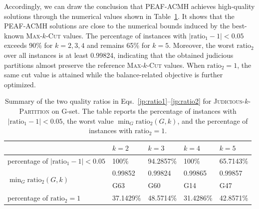\documentclass[12pt, a4paper]{article}%
\numberwithin{equation}{section}
\theoremstyle{plain}
\begin{document}
            Accordingly, we can draw the conclusion that PEAF-ACMH achieves high-quality solutions through the numerical values shown in Table~\ref{tab:jp-quality}. {It shows that the PEAF-ACMH solutions are close to the numerical
bounds induced by the best-known \textsc{Max}-$k$-\textsc{Cut} values. The
percentage of instances with $|\text{ratio}_1-1|<0.05$ exceeds 90\% for
$k=2,3,4$ and remains 65\% for $k=5$. Moreover, the worst
$\text{ratio}_2$ over all instances is at least 0.99824, indicating
that the obtained judicious partitions almost preserve the reference
\textsc{Max}-$k$-\textsc{Cut} values. When $\text{ratio}_2=1$, the same cut
value is attained while the balance-related objective is further optimized.}
			
			
			
			\begin{table}[htbp]
				\centering
				\caption{{Summary of the two quality ratios in
Eqs.~\eqref{jp:ratio1}--\eqref{jp:ratio2} for
\textsc{Judicious}-$k$-\textsc{Partition} on G-set. The table reports the
percentage of instances with $|\text{ratio}_1-1|<0.05$, the worst value
$\min_G \text{ratio}_2(G,k)$, and the percentage of instances with
$\text{ratio}_2=1$.}}
				\label{tab:jp-quality}
				\begin{tabular}{|l|l|l|l|l|}
					\hline
					& $k=2$     & $k=3$     & $k=4$     & $k=5$     \\ \hline
					percentage of $|\text{ratio}_1-1|< 0.05$          & 100\%     & 94.2857\% & 100\%     & 65.7143\% \\ \hline
					\multirow{2}{*}{$\min_{G}\text{ratio}_2(G,k)$} & 0.99852   & 0.99824   & 0.99865   & 0.99857   \\
					& G63       & G60       & G14       & G47       \\ \hline
					percentage of $\text{ratio}_2=1$                 & 37.1429\% & 48.5714\% & 31.4286\% & 42.8571\% \\ \hline
				\end{tabular}
			\end{table}
			
\end{document}
